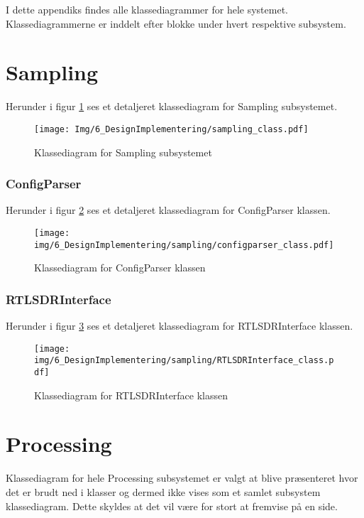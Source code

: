 \begin{appendices}
I dette appendiks findes alle klassediagrammer for hele systemet. Klassediagrammerne er inddelt efter blokke under hvert respektive subsystem.

\section{Sampling}


Herunder i figur \ref{fig:sampling_class} ses et detaljeret klassediagram for Sampling subsystemet.
\begin{figure}[H]
	\centering
	\texttt{[image: Img/6\_DesignImplementering/sampling\_class.pdf]}
	\caption{Klassediagram for Sampling subsystemet}
	\label{fig:sampling_class}
\end{figure}

\pagebreak

\subsubsection{ConfigParser}
Herunder i figur \ref{fig:configparser_class} ses et detaljeret klassediagram for ConfigParser klassen.
\begin{figure}[H]
	\centering
	\texttt{[image: img/6\_DesignImplementering/sampling/configparser\_class.pdf]}
	\caption{Klassediagram for ConfigParser klassen}
	\label{fig:configparser_class}
\end{figure}

\pagebreak

\subsubsection{RTLSDRInterface}
Herunder i figur \ref{fig:rtlsdrinterface_class} ses et detaljeret klassediagram for RTLSDRInterface klassen.
\begin{figure}[H]
	\centering
	\texttt{[image: img/6\_DesignImplementering/sampling/RTLSDRInterface\_class.pdf]}
	\caption{Klassediagram for RTLSDRInterface klassen}
	\label{fig:rtlsdrinterface_class}
\end{figure}


\pagebreak

\section{Processing}
Klassediagram for hele Processing subsystemet er valgt at blive præsenteret hvor det er brudt ned i klasser og dermed ikke vises som et samlet subsystem klassediagram. Dette skyldes at det vil være for stort at fremvise på en side.



\end{appendices}
